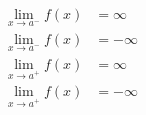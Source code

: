 \begin{equation}
\begin{split}
    \lim_{x \to a^{-}} f(x) &= \infty \\
    \lim_{x \to a^{-}} f(x) &= -\infty \\
    \lim_{x \to a^{+}} f(x) &= \infty \\
    \lim_{x \to a^{+}} f(x) &= -\infty
\end{split}
\end{equation}